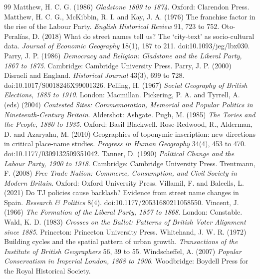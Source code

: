 \documentclass[11pt,a4paper]{article}
\begin{document}
\begin{thebibliography}{99}
 Matthew, H. C. G. (1986) \textit{Gladstone 1809 to 1874}. Oxford: Clarendon Press.
 Matthew, H. C. G., McKibbin, R. I. and Kay, J. A. (1976) The franchise factor in the rise of the Labour Party. \textit{English Historical Review} 91, 723 to 752.
 Oto-Peralías, D. (2018) What do street names tell us? The `city-text' as socio-cultural data. \textit{Journal of Economic Geography} 18(1), 187 to 211. doi:10.1093/jeg/lbx030.
 Parry, J. P. (1986) \textit{Democracy and Religion: Gladstone and the Liberal Party, 1867 to 1875}. Cambridge: Cambridge University Press.
 Parry, J. P. (2000) Disraeli and England. \textit{Historical Journal} 43(3), 699 to 728. doi:10.1017/S0018246X99001326.
 Pelling, H. (1967) \textit{Social Geography of British Elections, 1885 to 1910}. London: Macmillan.
 Pickering, P. A. and Tyrrell, A. (eds) (2004) \textit{Contested Sites: Commemoration, Memorial and Popular Politics in Nineteenth-Century Britain}. Aldershot: Ashgate.
 Pugh, M. (1985) \textit{The Tories and the People, 1880 to 1935}. Oxford: Basil Blackwell.
 Rose-Redwood, R., Alderman, D. and Azaryahu, M. (2010) Geographies of toponymic inscription: new directions in critical place-name studies. \textit{Progress in Human Geography} 34(4), 453 to 470. doi:10.1177/0309132509351042.
 Tanner, D. (1990) \textit{Political Change and the Labour Party, 1900 to 1918}. Cambridge: Cambridge University Press.
 Trentmann, F. (2008) \textit{Free Trade Nation: Commerce, Consumption, and Civil Society in Modern Britain}. Oxford: Oxford University Press.
 Villamil, F. and Balcells, L. (2021) Do TJ policies cause backlash? Evidence from street name changes in Spain. \textit{Research \& Politics} 8(4). doi:10.1177/20531680211058550.
 Vincent, J. (1966) \textit{The Formation of the Liberal Party, 1857 to 1868}. London: Constable.
 Wald, K. D. (1983) \textit{Crosses on the Ballot: Patterns of British Voter Alignment since 1885}. Princeton: Princeton University Press.
 Whitehand, J. W. R. (1972) Building cycles and the spatial pattern of urban growth. \textit{Transactions of the Institute of British Geographers} 56, 39 to 55.
 Windscheffel, A. (2007) \textit{Popular Conservatism in Imperial London, 1868 to 1906}. Woodbridge: Boydell Press for the Royal Historical Society.
\end{thebibliography}
\end{document}
